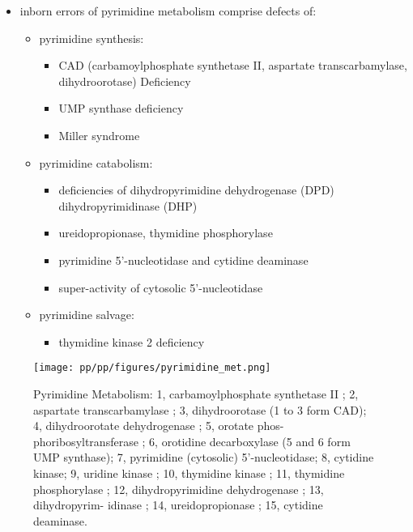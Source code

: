 \documentclass{scrartcl}
\begin{document}
\begin{itemize}
\item inborn errors of pyrimidine metabolism comprise defects of:
\begin{itemize}
\item pyrimidine synthesis:
\begin{itemize}
\item CAD (carbamoylphosphate synthetase II, aspartate transcarbamylase, dihydroorotase) Deficiency
\item UMP synthase deficiency
\item Miller syndrome
\end{itemize}
\item pyrimidine catabolism:
\begin{itemize}
\item deficiencies of dihydropyrimidine
dehydrogenase (DPD) dihydropyrimidinase (DHP)
\item ureidopropionase, thymidine phosphorylase
\item pyrimidine 5’-nucleotidase and cytidine deaminase
\item super-activity of cytosolic 5’-nucleotidase
\end{itemize}
\item pyrimidine salvage:
\begin{itemize}
\item thymidine kinase 2 deficiency
\end{itemize}
\end{itemize}
\end{itemize}

\begin{figure}[htbp]
\centering
\texttt{[image: pp/pp/figures/pyrimidine\_met.png]}
\caption{\label{fig:orgac871b0}Pyrimidine Metabolism: 1, carbamoylphosphate synthetase II ; 2, aspartate transcarbamylase ; 3, dihydroorotase (1 to 3 form CAD); 4, dihydroorotate dehydrogenase ; 5, orotate phos- phoribosyltransferase ; 6, orotidine decarboxylase (5 and 6 form UMP synthase); 7, pyrimidine (cytosolic) 5’-nucleotidase; 8, cytidine kinase; 9, uridine kinase ; 10, thymidine kinase ; 11, thymidine phosphorylase ; 12, dihydropyrimidine dehydrogenase ; 13, dihydropyrim- idinase ; 14, ureidopropionase ; 15, cytidine deaminase.}
\end{figure}
\end{document}

